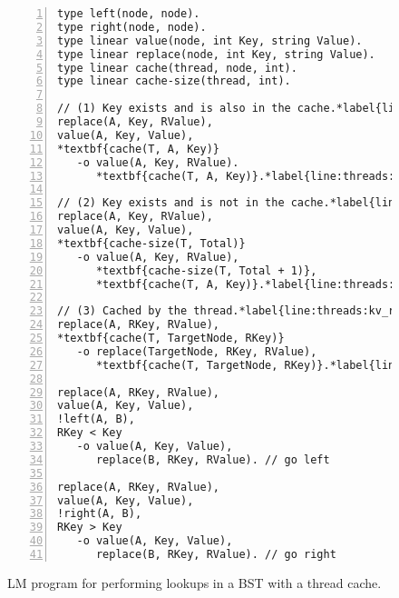 \begin{figure}[ht]
\begin{Verbatim}[numbers=left,fontsize=\codesize,commandchars=*\{\}]
type left(node, node).
type right(node, node).
type linear value(node, int Key, string Value).
type linear replace(node, int Key, string Value).
type linear cache(thread, node, int).
type linear cache-size(thread, int).

// (1) Key exists and is also in the cache.*label{line:threads:kv_rule1_start}
replace(A, Key, RValue),
value(A, Key, Value),
*textbf{cache(T, A, Key)}
   -o value(A, Key, RValue).
      *textbf{cache(T, A, Key)}.*label{line:threads:kv_rule1_end}

// (2) Key exists and is not in the cache.*label{line:threads:kv_rule2_start}
replace(A, Key, RValue),
value(A, Key, Value),
*textbf{cache-size(T, Total)}
   -o value(A, Key, RValue),
      *textbf{cache-size(T, Total + 1)},
      *textbf{cache(T, A, Key)}.*label{line:threads:kv_rule2_end}

// (3) Cached by the thread.*label{line:threads:kv_rule3_start}
replace(A, RKey, RValue),
*textbf{cache(T, TargetNode, RKey)}
   -o replace(TargetNode, RKey, RValue),
      *textbf{cache(T, TargetNode, RKey)}.*label{line:threads:kv_rule3_end}

replace(A, RKey, RValue),
value(A, Key, Value),
!left(A, B),
RKey < Key
   -o value(A, Key, Value),
      replace(B, RKey, RValue). // go left

replace(A, RKey, RValue),
value(A, Key, Value),
!right(A, B),
RKey > Key
   -o value(A, Key, Value),
      replace(B, RKey, RValue). // go right
\end{Verbatim}
\caption{LM program for performing lookups in a BST with a thread cache.}
\label{code:threads:btree_lookup_cache}
\end{figure}

\clearpage
